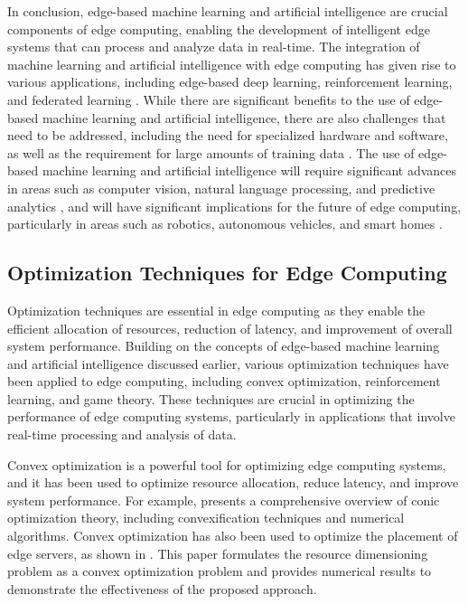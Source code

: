 \documentclass[11pt]{article}
\begin{document}
In conclusion, edge-based machine learning and artificial intelligence are crucial components of edge computing, enabling the development of intelligent edge systems that can process and analyze data in real-time. The integration of machine learning and artificial intelligence with edge computing has given rise to various applications, including edge-based deep learning, reinforcement learning, and federated learning \cite{ref75}. While there are significant benefits to the use of edge-based machine learning and artificial intelligence, there are also challenges that need to be addressed, including the need for specialized hardware and software, as well as the requirement for large amounts of training data \cite{ref6}. The use of edge-based machine learning and artificial intelligence will require significant advances in areas such as computer vision, natural language processing, and predictive analytics \cite{ref79}, and will have significant implications for the future of edge computing, particularly in areas such as robotics, autonomous vehicles, and smart homes \cite{ref80}.

\subsection{Optimization Techniques for Edge Computing}

Optimization techniques are essential in edge computing as they enable the efficient allocation of resources, reduction of latency, and improvement of overall system performance. Building on the concepts of edge-based machine learning and artificial intelligence discussed earlier, various optimization techniques have been applied to edge computing, including convex optimization, reinforcement learning, and game theory. These techniques are crucial in optimizing the performance of edge computing systems, particularly in applications that involve real-time processing and analysis of data.

Convex optimization is a powerful tool for optimizing edge computing systems, and it has been used to optimize resource allocation, reduce latency, and improve system performance. For example, \cite{ref81} presents a comprehensive overview of conic optimization theory, including convexification techniques and numerical algorithms. Convex optimization has also been used to optimize the placement of edge servers, as shown in \cite{ref82}. This paper formulates the resource dimensioning problem as a convex optimization problem and provides numerical results to demonstrate the effectiveness of the proposed approach.
\end{document}
